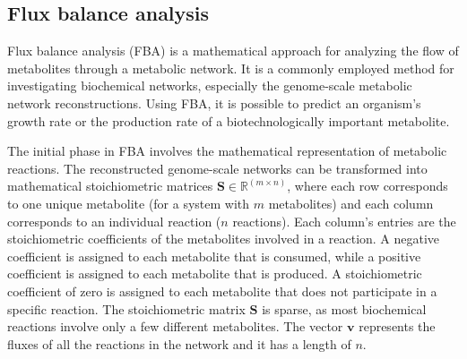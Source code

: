 
\subsection{Flux balance analysis}

Flux balance analysis (FBA) is a mathematical approach for analyzing the flow of metabolites through a metabolic network. It is a commonly employed method for investigating biochemical networks, especially the genome-scale metabolic network reconstructions. Using FBA, it is possible to predict an organism's growth rate or the production rate of a biotechnologically important metabolite. \cite{Orth2010}

The initial phase in FBA involves the mathematical representation of metabolic reactions. The reconstructed genome-scale networks can be transformed into mathematical stoichiometric matrices $\mathbf{S}\in\mathbb{R}^{(m\times n)}$, where each row corresponds to one unique metabolite (for a system with $m$ metabolites) and each column corresponds to an individual reaction ($n$ reactions).
Each column's entries are the stoichiometric coefficients of the metabolites involved in a reaction. A negative coefficient is assigned to each metabolite that is consumed, while a positive coefficient is assigned to each metabolite that is produced. A stoichiometric coefficient of zero is assigned to each metabolite that does not participate in a specific reaction. The stoichiometric matrix $\mathbf{S}$ is sparse, as most biochemical reactions involve only a few different metabolites.
The vector $\mathbf{v}$ represents the fluxes of all the reactions in the network and it has a length of $n$. \cite{Orth2010}


